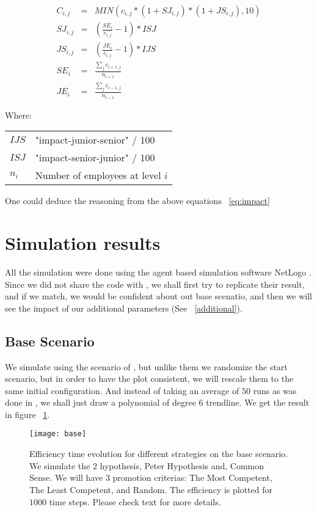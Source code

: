 \documentclass[11pt]{article}
\begin{document}
\begin{eqnarray}
\label{eq:impact}
C_{i,j} &=& MIN(c_{i,j} * (1 + SJ_{i,j}) * (1 + JS_{i,j}), 10) \\
SJ_{i,j} &=& \left(\frac{SE_i}{c_{i,j}} - 1 \right) * ISJ \\
JS_{i,j} &=& \left(\frac{JE_i}{c_{i,j}} - 1 \right) * IJS \\
SE_i &=& \frac{\sum_j c_{i+1,j}}{n_{i+1}} \\
JE_i &=& \frac{\sum_j c_{i-1,j}}{n_{i-1}}
\end{eqnarray}

Where:
\begin{tabular}{l l}
$IJS$ & "impact-junior-senior" / 100 \\
$ISJ$ & "impact-senior-junior" / 100 \\
$n_i$ & Number of employees at level $i$  \\
\end{tabular}

One could deduce the reasoning from the above equations ~\ref{eq:impact}

\section{Simulation results}
All the simulation were done using the agent based simulation software NetLogo \cite{netlogo}. Since we did not share the code with \cite{petercomp}, we shall first try to replicate their result, and if we match, we would be confident about out base scenatio, and then we will see the impact of our additional parameters (See ~\ref{additional}).

\subsection{Base Scenario}
\label{base}
We simulate using the scenario of \cite{petercomp}, but unlike them we randomize the start scenario, but in order to have the plot consistent, we will rescale them to the same initial configuration. And instead of taking an average of $50$ runs as was done in \cite{petercomp}, we shall just draw a polynomial of degree $6$ trendline. We get the result in figure ~\ref{fig:base}.

\begin{figure}
\begin{center}
\texttt{[image: base]}
\caption{Efficiency time evolution for different strategies on the base scenario. We simulate the $2$ hypothesis, Peter Hypothesis and, Common Sense. We will have $3$ promotion criterias: The Most Competent, The Least Competent, and Random. The efficiency is plotted for $1000$ time steps. Please check text for more details.}


\label{fig:base}
\end{center}
\end{figure}
\end{document}
